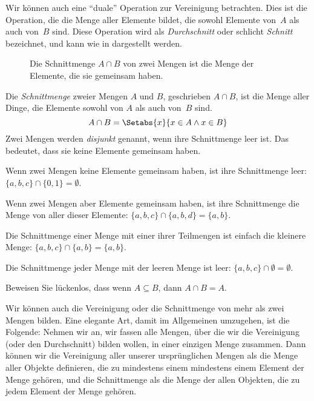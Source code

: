 \documentclass[../../../include/open-logic-section]{subfiles}
\begin{document}
\begin{explain}
Wir können auch eine ``duale'' Operation zur Vereinigung betrachten. Dies ist die
Operation, die die Menge aller Elemente bildet, die sowohl Elemente
von~$A$ als auch von~$B$ sind. Diese Operation wird als 
\emph{Durchschnitt} oder schlicht \emph{Schnitt} bezeichnet, und kann wie in  dargestellt werden.
\begin{figure}
  \caption{Die Schnittmenge $A \cap B$ von zwei Mengen ist die Menge der
    Elemente, die sie gemeinsam haben.}
\end{figure}
\end{explain}

\begin{defn}[Schnittmenge]
Die \emph{Schnittmenge} zweier Mengen $A$ und $B$, geschrieben $A \cap B$, ist
die Menge aller Dinge, die Elemente sowohl von $A$ als auch von~$B$ sind.
\[
A \cap B = \Setabs{x}{x \in A \land x \in B}
\]
Zwei Mengen werden \emph{disjunkt} genannt, wenn ihre Schnittmenge
leer ist. Das bedeutet, dass sie keine Elemente gemeinsam haben.
\end{defn}

\begin{ex}
Wenn zwei Mengen keine Elemente gemeinsam haben, ist ihre Schnittmenge leer:
$\{ a, b, c\} \cap \{ 0, 1\} = \emptyset$.

Wenn zwei Mengen aber Elemente gemeinsam haben, ist ihre Schnittmenge die Menge von
aller dieser Elemente: $\{a, b, c \} \cap \{a, b, d \} = \{a, b\}$.

Die Schnittmenge einer Menge mit einer ihrer Teilmengen ist einfach die kleinere
Menge: $\{a, b, c\} \cap \{a, b\} = \{a, b\}$.

Die Schnittmenge jeder Menge mit der leeren Menge ist leer: $\{a, b, c \}
\cap \emptyset = \emptyset$.
\end{ex}

\begin{prob}
Beweisen Sie lückenlos, dass wenn $A \subseteq B$, dann $A \cap B = A$.
\end{prob}

\begin{explain}
Wir können auch die Vereinigung oder die Schnittmenge von mehr als zwei
Mengen bilden. Eine elegante Art, damit im Allgemeinen umzugehen, ist die Folgende:
Nehmen wir an, wir fassen alle Mengen, über die wir die Vereinigung (oder den Durchschnitt) bilden wollen,
in einer einzigen Menge zusammen. Dann können wir die Vereinigung
aller unserer ursprünglichen Mengen als die Menge aller Objekte definieren, die zu mindestens einem
mindestens einem Element der Menge gehören, und die Schnittmenge als die Menge der
allen Objekten, die zu jedem Element der Menge gehören.
\end{explain}
\end{document}
